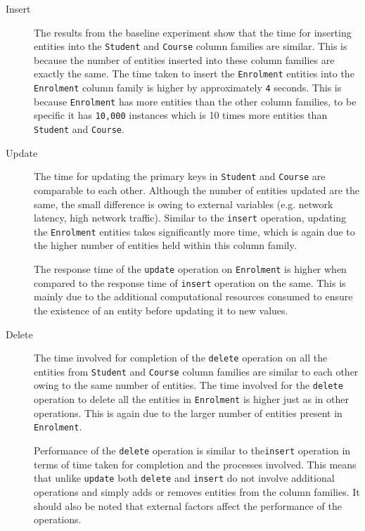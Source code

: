	\begin{description}
	\item[Insert] The results from the baseline experiment show that the time for
	inserting entities into the \texttt{Student} and \texttt{Course} column families 
	are similar. This is because the number of entities inserted into these
	column families are exactly the same.
	The time taken
	to insert the \texttt{Enrolment} entities into the \texttt{Enrolment} column family
	is higher by approximately \texttt{4} seconds. This is because
	\texttt{Enrolment} has more entities than the other column families, to be
	specific it has \texttt{10,000} instances which is 10 times more entities than
	\texttt{Student} and \texttt{Course}.
	
	\item[Update] The time for updating the primary keys in \texttt{Student} and
	\texttt{Course} are comparable to each other. Although the number of entities
	updated are the same, the small difference is owing to external variables
	(e.g. network latency, high network traffic). Similar to the \texttt{insert}
	operation, updating the \texttt{Enrolment} entities takes significantly more
	time, which is again due to the higher number of entities held within this
	column family. 
	
	The  response time of the \texttt{update} operation on
	\texttt{Enrolment} is higher when compared to the response  time of
	\texttt{insert} operation on the same. This is mainly due to the additional
	computational resources consumed to ensure the existence of an entity before
	updating it to new values.
	
	\item[Delete] The time involved for completion of the \texttt{delete} operation
	on all the entities from \texttt{Student} and \texttt{Course} column families
	are similar to each other owing to the same number of entities. The time
	involved for the \texttt{delete} operation to delete all the entities in
	\texttt{Enrolment} is higher just as in other operations. This is again due to
	the larger number of entities present in \texttt{Enrolment}.
	
	Performance of the \texttt{delete} operation is similar to the\texttt{insert}
	operation in terms of time taken for completion and the processes involved. This
	means that unlike \texttt{update} both \texttt{delete} and \texttt{insert} do
	not involve additional operations and simply adds or removes entities from the
	column families. It should also be noted that external factors affect the
	performance of the operations.
	
	\end{description} 

